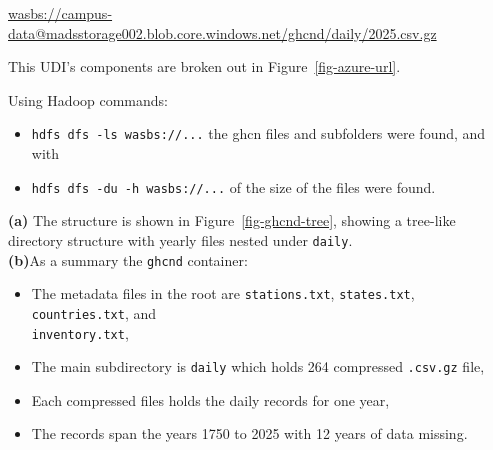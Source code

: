 \documentclass[11pt]{article}
\begin{document}
\begin{center}
    \url{wasbs://campus-data@madsstorage002.blob.core.windows.net/ghcnd/daily/2025.csv.gz}
    \end{center}

    This UDI's components are broken out in Figure~\ref{fig-azure-url}.  
    
    Using Hadoop commands: 
     \begin{itemize}
        \item \texttt{hdfs dfs -ls    wasbs://...} the ghcn files and subfolders were found, and with
        \item \texttt{hdfs dfs -du -h wasbs://...} of the size of the files were found.
    \end{itemize}
    \textbf{(a)} The structure is shown in Figure~\ref{fig-ghcnd-tree}, showing a tree-like directory structure with yearly files nested under \texttt{daily}.\\
    \textbf{(b)}As a summary  the \texttt{ghcnd} container: 
    \begin{itemize}
        \item The metadata files in the root are \texttt{stations.txt}, \texttt{states.txt}, \texttt{countries.txt}, and\\ \texttt{inventory.txt},
        \item The main subdirectory is \texttt{daily} which holds 264 compressed \texttt{.csv.gz} file, 
        \item Each compressed files  holds the daily records for one year, 
        \item The records span the years 1750 to 2025 with 12 years of data missing. 
    \end{itemize}
    
\end{document}
